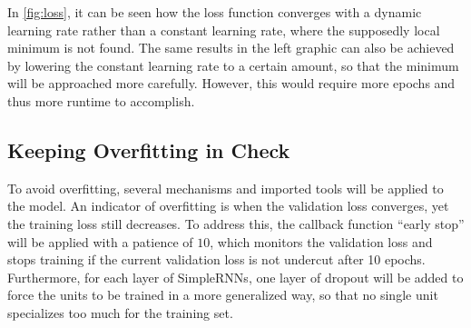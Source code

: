 %
In \ref{fig:loss}, it can be seen how the loss function converges with a dynamic learning rate rather than a constant learning rate, where the supposedly local minimum is not found. The same results in the left graphic can also be achieved by lowering the constant learning rate to a certain amount, so that the minimum will be approached more carefully. However, this would require more epochs and thus more runtime to accomplish.
\subsection{Keeping Overfitting in Check}
To avoid overfitting, several mechanisms and imported tools will be applied to the model. An indicator of overfitting is when the validation loss converges, yet the training loss still decreases. To address this, the callback function \enquote{early stop} \cite{keras} will be applied with a patience of $10$, which monitors the validation loss and stops training if the current validation loss is not undercut after 10 epochs.
Furthermore, for each layer of SimpleRNNs, one layer of dropout will be added to force the units to be trained in a more generalized way, so that no single unit specializes too much for the training set.